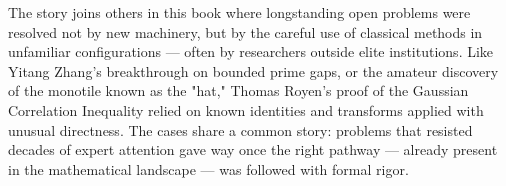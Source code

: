 \begin{commentary}
The story joins others in this book where longstanding open problems were resolved not by new machinery, but by the careful use of classical methods in unfamiliar configurations — often by researchers outside elite institutions. Like Yitang Zhang's breakthrough on bounded prime gaps, or the amateur discovery of the monotile known as the "hat," Thomas Royen's proof of the Gaussian Correlation Inequality relied on known identities and transforms applied with unusual directness. The cases share a common story: problems that resisted decades of expert attention gave way once the right pathway — already present in the mathematical landscape — was followed with formal rigor.
\end{commentary}

